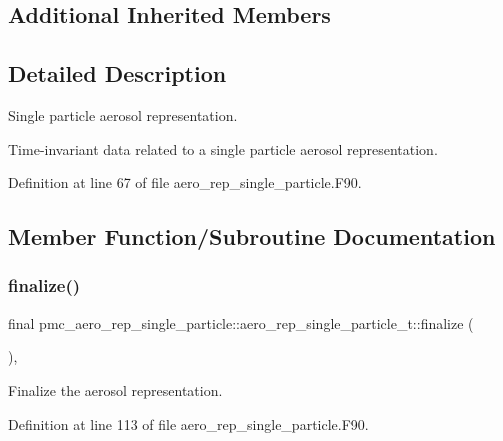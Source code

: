 \subsection*{Additional Inherited Members}


\subsection{Detailed Description}
Single particle aerosol representation. 

Time-\/invariant data related to a single particle aerosol representation. 

Definition at line 67 of file aero\+\_\+rep\+\_\+single\+\_\+particle.\+F90.



\subsection{Member Function/\+Subroutine Documentation}
\mbox{\label{structpmc__aero__rep__single__particle_1_1aero__rep__single__particle__t_a8b15dadc4edee1c9b401c9578e78daf6}} 
\subsubsection{\texorpdfstring{finalize()}{finalize()}}
{\footnotesize\ttfamily final pmc\+\_\+aero\+\_\+rep\+\_\+single\+\_\+particle\+::aero\+\_\+rep\+\_\+single\+\_\+particle\+\_\+t\+::finalize (\begin{DoxyParamCaption}{ }\end{DoxyParamCaption})\hspace{0.3cm}{\ttfamily [final]}, {\ttfamily [private]}}



Finalize the aerosol representation. 



Definition at line 113 of file aero\+\_\+rep\+\_\+single\+\_\+particle.\+F90.

